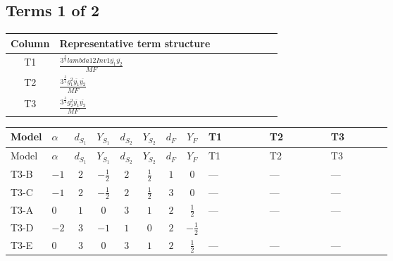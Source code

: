 \documentclass[8pt]{article}
\begin{document}
\begin{landscape}
\subsection*{Terms 1 of 2}
\begin{center}
\begin{tabular}{@{}c >{\raggedright\arraybackslash}p{0.82\linewidth}@{}}
\toprule
Column & Representative term structure \\
\midrule
T1 & \(\displaystyle \frac{3^{\frac{3}{4}} lambda12Inv1 \overline{y_{1}} \overline{y_{2}}}{MF}\) \\
\midrule
T2 & \(\displaystyle \frac{3^{\frac{3}{4}} g_{1}^{2} \overline{y_{1}} \overline{y_{2}}}{MF}\) \\
\midrule
T3 & \(\displaystyle \frac{3^{\frac{3}{4}} g_{2}^{2} \overline{y_{1}} \overline{y_{2}}}{MF}\) \\
\midrule
\bottomrule
\end{tabular}
\end{center}
\smallskip
\tiny
\begin{longtable}{@{}llcccccc >{\raggedright\arraybackslash}p{0.21\linewidth} >{\raggedright\arraybackslash}p{0.21\linewidth} >{\raggedright\arraybackslash}p{0.21\linewidth}@{}}
\toprule
Model & $\alpha$ & $d_{S_1}$ & $Y_{S_1}$ & $d_{S_2}$ & $Y_{S_2}$ & $d_F$ & $Y_F$ & T1 & T2 & T3 \\
\midrule
\endfirsthead
\toprule
Model & $\alpha$ & $d_{S_1}$ & $Y_{S_1}$ & $d_{S_2}$ & $Y_{S_2}$ & $d_F$ & $Y_F$ & T1 & T2 & T3 \\
\midrule
\endhead
T3-B & $-1$ & $2$ & $-\frac{1}{2}$ & $2$ & $\frac{1}{2}$ & $1$ & $0$ & --- & --- & --- \\
\midrule
T3-C & $-1$ & $2$ & $-\frac{1}{2}$ & $2$ & $\frac{1}{2}$ & $3$ & $0$ & --- & --- & --- \\
\midrule
T3-A & $0$ & $1$ & $0$ & $3$ & $1$ & $2$ & $\frac{1}{2}$ & --- & --- & --- \\
\midrule
T3-D & $-2$ & $3$ & $-1$ & $1$ & $0$ & $2$ & $-\frac{1}{2}$ & \scriptsize\adjustbox{max width=\linewidth}{$\begin{gathered} \frac{3^{\frac{3}{4}} lambda12Inv1 \overline{y_{1}} \overline{y_{2}}}{6 MF}\end{gathered}$} & \scriptsize\adjustbox{max width=\linewidth}{$\begin{gathered} \frac{3^{\frac{3}{4}} g_{1}^{2} \overline{y_{1}} \overline{y_{2}}}{8 MF}\end{gathered}$} & \scriptsize\adjustbox{max width=\linewidth}{$\begin{gathered} \frac{17 \cdot 3^{\frac{3}{4}} g_{2}^{2} \overline{y_{1}} \overline{y_{2}}}{24 MF}\end{gathered}$} \\
\midrule
T3-E & $0$ & $3$ & $0$ & $3$ & $1$ & $2$ & $\frac{1}{2}$ & --- & --- & --- \\
\midrule
\bottomrule
\end{longtable}
\clearpage

\end{landscape}
\end{document}

